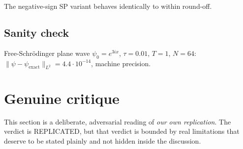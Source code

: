 \documentclass[11pt]{article}
\begin{document}
The negative-sign SP variant behaves identically to within round-off.

\subsection{Sanity check}
Free-Schr\"odinger plane wave $\psi_0=e^{3ix}$, $\tau=0.01$, $T=1$, $N=64$:
$\|\psi-\psi_{\mathrm{exact}}\|_{L^2}=4.4\!\cdot\!10^{-14}$, machine precision.

\section{Genuine critique}

This section is a deliberate, adversarial reading of \emph{our own replication}.
The verdict is REPLICATED, but that verdict is bounded by real limitations
that deserve to be stated plainly and not hidden inside the discussion.
\end{document}
